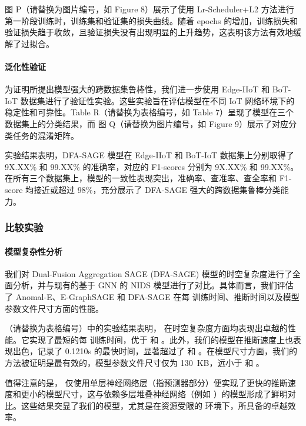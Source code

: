 \documentclass{article}
\begin{document}
图 P（请替换为图片编号，如 Figure 8）展示了使用 Lr-Scheduler+L2
方法进行第一阶段训练时，训练集和验证集的损失曲线。随着 epochs
的增加，训练损失和验证损失趋于收敛，且验证损失没有出现明显的上升趋势，这表明该方法有效地缓解了过拟合。

\paragraph{泛化性验证}

为证明所提出模型强大的跨数据集鲁棒性，我们进一步使用 Edge-IIoT 和 BoT-IoT
数据集进行了验证性实验。这些实验旨在评估模型在不同 IoT 网络环境下的稳定性和可靠性。Table R（请替换为表格编号，如 Table
7）呈现了模型在三个数据集上的分类结果，而 图 Q（请替换为图片编号，如 Figure 9）展示了对应分类任务的混淆矩阵。

实验结果表明，DFA-SAGE 模型在 Edge-IIoT 和 BoT-IoT 数据集上分别取得了 9X.XX\% 和 99.XX\%
的准确率，对应的 F1-scores 分别为 9X.XX\% 和
99.XX\%。在所有三个数据集上，模型的一致性表现突出，准确率、查准率、查全率和 F1-score 均接近或超过 98\%，充分展示了
DFA-SAGE 强大的跨数据集鲁棒分类能力。

\subsubsection{比较实验}

\paragraph{模型复杂性分析}

我们对 Dual-Fusion Aggregation SAGE (DFA-SAGE) 模型的时空复杂度进行了全面分析，并与现有的基于
GNN 的 NIDS 模型进行了对比。具体而言，我们评估了 Anomal-E、E-GraphSAGE 和 DFA-SAGE 在每
 训练时间、推断时间以及模型参数文件尺寸方面的性能。

（请替换为表格编号）中的实验结果表明，
在时空复杂度方面均表现出卓越的性能。它实现了最短的每  训练时间，优于  和
。此外，我们的模型在推断速度上也表现出色，记录了 0.1210s 的最快时间，显著超过了
 和 。在模型尺寸方面，我们的方法被证明是最有效的，模型参数文件尺寸仅为
130 KB，远小于  和 。

值得注意的是，
仅使用单层神经网络层（指预测器部分）便实现了更快的推断速度和更小的模型尺寸，这与依赖多层堆叠神经网络（例如
）的模型形成了鲜明对比。这些结果突显了我们的模型，尤其是在资源受限的  环境下，所具备的卓越效率。
\end{document}
